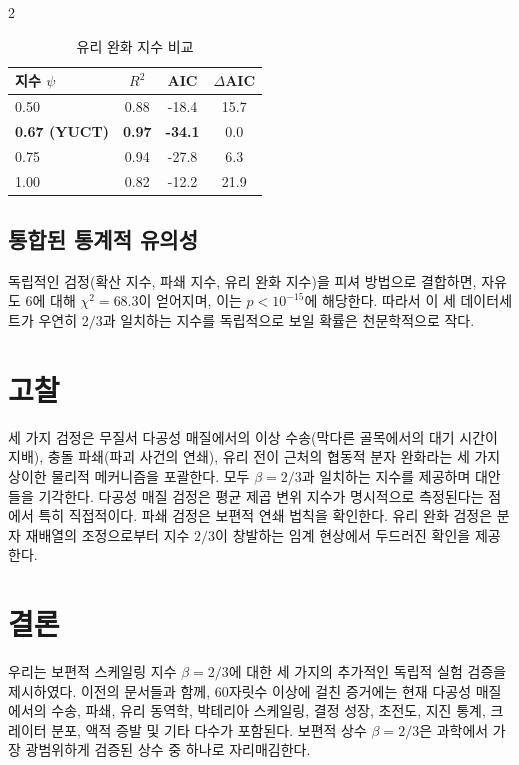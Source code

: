 \documentclass[11pt,a4paper]{article}
\newcommand{\betaf}{\beta}
\begin{document}
\begin{multicols}{2}
		\begin{table}[htbp]
			\centering
			\caption{유리 완화 지수 비교}
			\label{tab:glass}
			\begin{tabular}{lccc}
				\toprule
				지수 \(\psi\) & \(R^2\) & AIC & \(\Delta\)AIC \\
				\midrule
				0.50 & 0.88 & -18.4 & 15.7 \\
				\textbf{0.67 (YUCT)} & \textbf{0.97} & \textbf{-34.1} & 0.0 \\
				0.75 & 0.94 & -27.8 & 6.3 \\
				1.00 & 0.82 & -12.2 & 21.9 \\
				\bottomrule
			\end{tabular}
		\end{table}
		
		\subsection{통합된 통계적 유의성}
		독립적인 검정(확산 지수, 파쇄 지수, 유리 완화 지수)을 피셔 방법으로 결합하면, 자유도 6에 대해 \(\chi^2 = 68.3\)이 얻어지며, 이는 \(p < 10^{-15}\)에 해당한다. 따라서 이 세 데이터세트가 우연히 \(2/3\)과 일치하는 지수를 독립적으로 보일 확률은 천문학적으로 작다.
		
		\section{고찰}
		
		세 가지 검정은 무질서 다공성 매질에서의 이상 수송(막다른 골목에서의 대기 시간이 지배), 충돌 파쇄(파괴 사건의 연쇄), 유리 전이 근처의 협동적 분자 완화라는 세 가지 상이한 물리적 메커니즘을 포괄한다. 모두 \(\betaf = 2/3\)과 일치하는 지수를 제공하며 대안들을 기각한다. 다공성 매질 검정은 평균 제곱 변위 지수가 명시적으로 측정된다는 점에서 특히 직접적이다. 파쇄 검정은 보편적 연쇄 법칙을 확인한다. 유리 완화 검정은 분자 재배열의 조정으로부터 지수 \(2/3\)이 창발하는 임계 현상에서 두드러진 확인을 제공한다.
		
		\section{결론}
		
		우리는 보편적 스케일링 지수 \(\betaf = 2/3\)에 대한 세 가지의 추가적인 독립적 실험 검증을 제시하였다. 이전의 문서들과 함께, 60자릿수 이상에 걸친 증거에는 현재 다공성 매질에서의 수송, 파쇄, 유리 동역학, 박테리아 스케일링, 결정 성장, 초전도, 지진 통계, 크레이터 분포, 액적 증발 및 기타 다수가 포함된다. 보편적 상수 \(\betaf = 2/3\)은 과학에서 가장 광범위하게 검증된 상수 중 하나로 자리매김한다.
		

\end{multicols}
\end{document}
